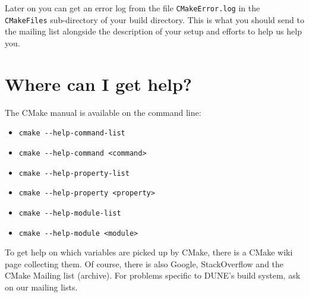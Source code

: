 \documentclass[a4paper,10pt,DIV9,headings=small]{scrartcl}
\begin{document}
Later on you can get an error log from the file \lstinline!CMakeError.log! in the \lstinline!CMakeFiles!
sub-directory of your build directory. This is what you should send to the mailing list alongside the
description of your setup and efforts to help us help you.

\section{Where can I get help?}
\label{help}

The CMake manual is available on the command line:
 \begin{itemize}
  \item \verb!cmake --help-command-list!
  \item \verb!cmake --help-command <command>!
  \item \verb!cmake --help-property-list!
  \item \verb!cmake --help-property <property>!
  \item \verb!cmake --help-module-list!
  \item \verb!cmake --help-module <module>!
 \end{itemize}

To get help on which variables are picked up by CMake, there is a CMake wiki page collecting them.
Of course, there is also Google, StackOverflow and the CMake Mailing list (archive).
For problems specific to DUNE's build system, ask on our mailing lists.
\end{document}

